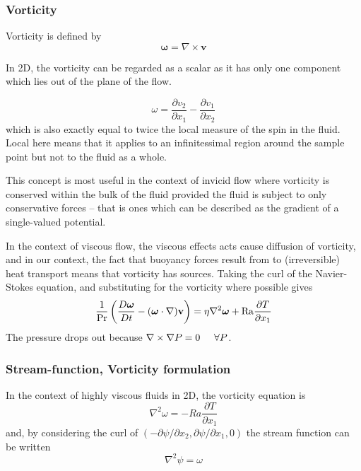 \documentclass[10pt]{article}
\begin{document}
		\subsubsection{Vorticity}
		
Vorticity is defined by
	\begin{equation}
		\boldsymbol{\omega} = \nabla \times \mathbf{v}
	\end{equation}
		
In 2D, the vorticity can be regarded as a scalar as it has only one component
which lies out of the plane of the flow.

	\begin{equation}
		\omega = \frac{\partial v_2}{\partial x_1} -
		 \frac{\partial v_1}{\partial x_2}
	\end{equation}
which is also exactly equal to twice the local measure of the spin in the fluid. 
Local here means that it applies to an infinitessimal region around the sample point but
not to the fluid as a whole.

This concept is most useful in the context of invicid flow where vorticity is
conserved within the bulk of the fluid provided the fluid is subject to only conservative forces --
that is ones which can be described as the gradient of a single-valued potential.

In the context of viscous flow, the viscous effects acts cause diffusion of
vorticity, and in our context, the fact that buoyancy forces result from to
(irreversible) heat transport means that vorticity has sources. Taking the
curl of the Navier-Stokes equation, and substituting for the vorticity where
possible gives
			\begin{equation}
				\frac{1}{\rm Pr} \left( \frac{D \boldsymbol{\omega}}{D t} - 
				(\boldsymbol{\omega} \cdot \nabla) \mathbf{v} \right) = 
					\eta \nabla ^2 \boldsymbol{\omega} + {\rm Ra} \frac{\partial T}{\partial x_1}
			\end{equation}
		The pressure drops out because $\nabla \times \nabla P = 0 \mbox{\hspace{0.5cm}} \forall P$. 
		
		\subsubsection{Stream-function, Vorticity formulation}
		
		In the context of highly viscous fluids in 2D,  the vorticity equation  is
			\begin{equation}
				\nabla ^2 \omega = - Ra \frac{\partial T}{\partial x_1}
				\label{eq:vorteqn}
			\end{equation}
		and, by considering the curl of 
		$(-\partial \psi / \partial x_2, \partial \psi / \partial x_1, 0)$
		the stream function can be written
			\begin{equation}
				\nabla ^2 \psi = \omega
				\label{eq:psivort}
			\end{equation}
		
\end{document}
